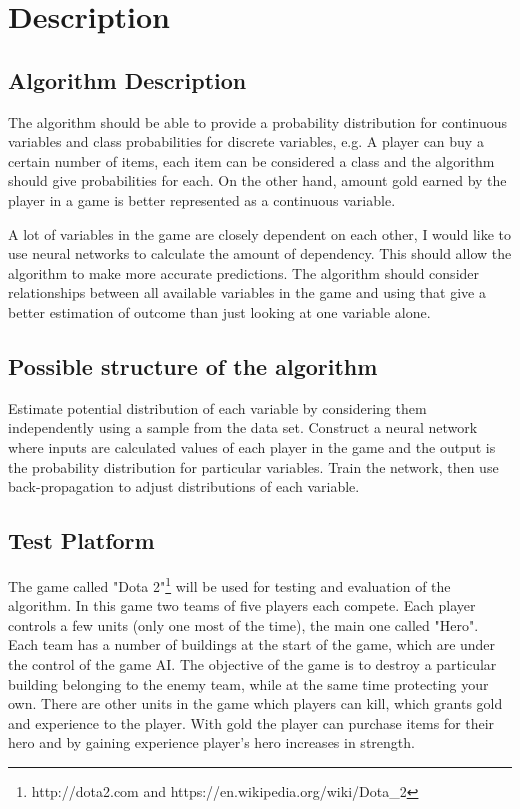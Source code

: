 \documentclass[12pt,a4paper]{article}
\begin{document}
\section{Description}
\subsection{Algorithm Description}
The algorithm should be able to provide a probability distribution for continuous variables and class probabilities for discrete variables, e.g. A player can buy a certain number of items, each item can be considered a class and the algorithm should give probabilities for each. On the other hand, amount gold earned by the player in a game is better represented as a continuous variable.

A lot of variables in the game are closely dependent on each other, I would like to use neural networks to calculate the amount of dependency. This should allow the algorithm to make more accurate predictions. The algorithm should consider relationships between all available variables in the game and using that give a better estimation of outcome than just looking at one variable alone.

\subsection{Possible structure of the algorithm}
Estimate potential distribution of each variable by considering them independently using a sample from the data set. Construct a neural network where inputs are calculated values of each player in the game and the output is the probability distribution for particular variables. Train the network, then use back-propagation to adjust distributions of each variable.

\subsection{Test Platform}
The game called "Dota 2"\footnote{http://dota2.com and https://en.wikipedia.org/wiki/Dota\_2} will be used for testing and evaluation of the algorithm. In this game two teams of five players each compete. Each player controls a few units (only one most of the time), the main one called "Hero". Each team has a number of buildings at the start of the game, which are under the control of the game AI. The objective of the game is to destroy a particular building belonging to the enemy team, while at the same time protecting your own. There are other units in the game which players can kill, which grants gold and experience to the player. With gold the player can purchase items for their hero and by gaining experience player's hero increases in strength.
\end{document}
